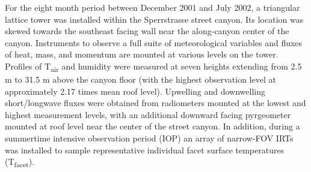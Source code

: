 \begin{bibunit}
For the eight month period between December 2001 and July 2002, a triangular lattice tower was installed within the Sperrstrasse street canyon. Its location was skewed towards the southeast facing wall near the along-canyon center of the canyon. Instruments to observe a full suite of meteorological variables and fluxes of heat, mass, and momentum are mounted at various levels on the tower. Profiles of T\textsubscript{air} and humidity were measured at seven heights extending from 2.5 \si{m} to 31.5 \si{m} above the canyon floor (with the highest observation level at approximately 2.17 times mean roof level). Upwelling and downwelling short/longwave fluxes were obtained from radiometers mounted at the lowest and highest measurement levels, with an additional downward facing pyrgeometer mounted at roof level near the center of the street canyon. In addition, during a summertime intensive observation period (IOP) an array of narrow-FOV IRTs was installed to sample representative individual facet surface temperatures (T\textsubscript{facet}).


\end{bibunit}
